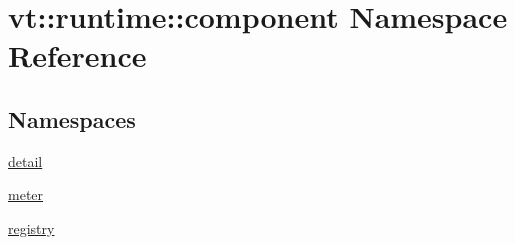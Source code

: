 \hypertarget{namespacevt_1_1runtime_1_1component}{}\section{vt\+:\+:runtime\+:\+:component Namespace Reference}
\label{namespacevt_1_1runtime_1_1component}
\subsection*{Namespaces}
\begin{DoxyCompactItemize}
\item 
 \hyperlink{namespacevt_1_1runtime_1_1component_1_1detail}{detail}
\item 
 \hyperlink{namespacevt_1_1runtime_1_1component_1_1meter}{meter}
\item 
 \hyperlink{namespacevt_1_1runtime_1_1component_1_1registry}{registry}
\end{DoxyCompactItemize}
